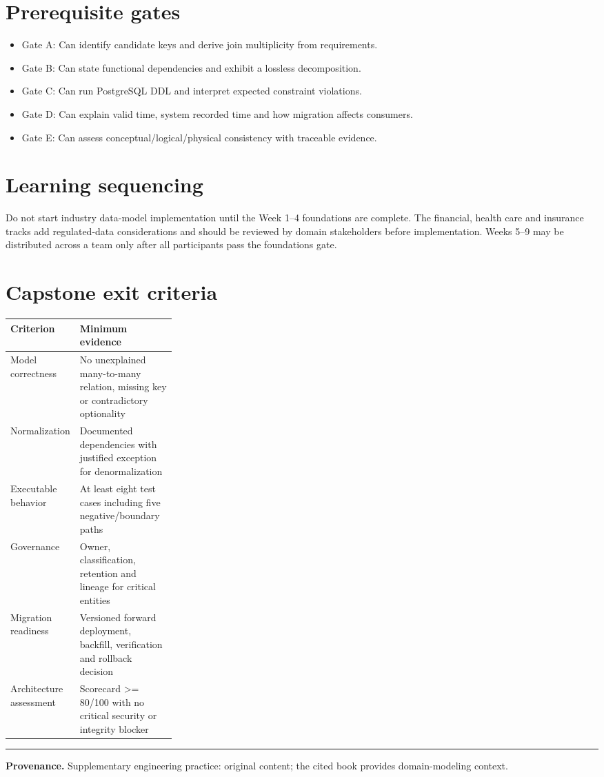 \documentclass[11pt,letterpaper]{article}
\begin{document}
\section{Prerequisite gates}
\begin{itemize}
\item Gate A: Can identify candidate keys and derive join multiplicity from requirements.
\item Gate B: Can state functional dependencies and exhibit a lossless decomposition.
\item Gate C: Can run PostgreSQL DDL and interpret expected constraint violations.
\item Gate D: Can explain valid time, system recorded time and how migration affects consumers.
\item Gate E: Can assess conceptual/logical/physical consistency with traceable evidence.
\end{itemize}

\section{Learning sequencing}
Do not start industry data-model implementation until the Week 1--4 foundations are complete. The financial, health care and insurance tracks add regulated-data considerations and should be reviewed by domain stakeholders before implementation. Weeks 5--9 may be distributed across a team only after all participants pass the foundations gate.


\section{Capstone exit criteria}
\begin{tabularx}{\linewidth}{@{}>{\raggedright\arraybackslash}p{0.28\linewidth}>{\raggedright\arraybackslash}X@{}}
\toprule
\textbf{Criterion} & \textbf{Minimum evidence} \\ 
\midrule
Model correctness & No unexplained many-to-many relation, missing key or contradictory optionality \\ 
Normalization & Documented dependencies with justified exception for denormalization \\ 
Executable behavior & At least eight test cases including five negative/boundary paths \\ 
Governance & Owner, classification, retention and lineage for critical entities \\ 
Migration readiness & Versioned forward deployment, backfill, verification and rollback decision \\ 
Architecture assessment & Scorecard >= 80/100 with no critical security or integrity blocker \\ 
\bottomrule
\end{tabularx}

\vfill
\hrule
{\footnotesize\textbf{Provenance.} Supplementary engineering practice: original content; the cited book provides domain-modeling context.}
\end{document}
